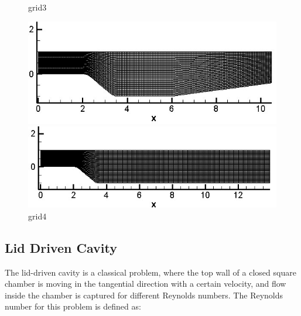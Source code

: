 \documentclass[12pt]{elsarticle}
\begin{document}
	\begin{figure}[h]
		\caption{grid3}
		\centering\includegraphics[width=0.7\linewidth]{grid3}
		\caption{grid4}
		\centering\includegraphics[width=0.7\linewidth]{grid4}
	\end{figure}
	
	\subsection{Lid Driven Cavity}
	
	The lid-driven cavity is a classical problem, where the top wall of a closed square chamber is moving in the tangential direction with a certain velocity, and flow inside the chamber is captured for different Reynolds numbers. The Reynolds number for this problem is defined as:
	
\end{document}
